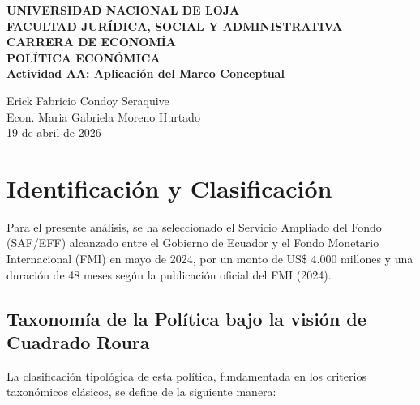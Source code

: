 \documentclass[12pt,spanish]{article}
\begin{document}
\begin{center}
    {\bfseries \Large UNIVERSIDAD NACIONAL DE LOJA}\\[0.3cm]
    {\bfseries \large FACULTAD JURÍDICA, SOCIAL Y
ADMINISTRATIVA}\\[0.2cm]
    {\bfseries CARRERA DE ECONOMÍA}\\[1.5cm]
    
    {\bfseries \large POLÍTICA ECONÓMICA}\\[1cm]
    
    {\bfseries \Large Actividad AA: Aplicación del Marco
Conceptual}\\[1.5cm]
\end{center}

\begin{center}
                        Erick Fabricio Condoy Seraquive \\
                \vspace{0.5cm}
    Econ. Maria Gabriela Moreno Hurtado \\ 
    19 de abril de 2026
\end{center}

\vspace{1cm}

\doublespacing
\setlength{\parindent}{1.27cm}

\section{Identificación y
Clasificación}\label{identificaciuxf3n-y-clasificaciuxf3n}

Para el presente análisis, se ha seleccionado el Servicio Ampliado del
Fondo (SAF/EFF) alcanzado entre el Gobierno de Ecuador y el Fondo
Monetario Internacional (FMI) en mayo de 2024, por un monto de US\$
4.000 millones y una duración de 48 meses según la publicación oficial
del FMI (2024).

\subsection{Taxonomía de la Política bajo la visión de Cuadrado
Roura}\label{taxonomuxeda-de-la-poluxedtica-bajo-la-visiuxf3n-de-cuadrado-roura}

La clasificación tipológica de esta política, fundamentada en los
criterios taxonómicos clásicos, se define de la siguiente manera:
\end{document}
